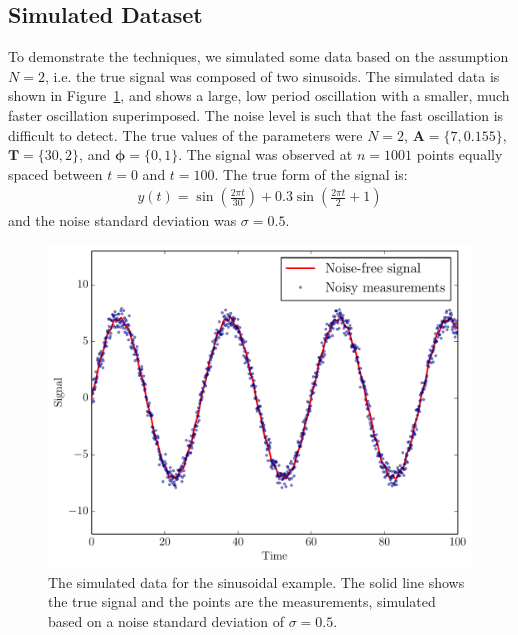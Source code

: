 \documentclass[letterpaper, 11pt]{article}
\begin{document}
\subsection{Simulated Dataset}
To demonstrate the techniques,
we simulated some data based on the assumption $N=2$, i.e. the true signal was
composed of two sinusoids.
The simulated data is shown in Figure~\ref{fig:sinewave_data}, and shows a
large, low period oscillation with a smaller, much faster oscillation
superimposed. The noise level is such that the fast oscillation is difficult
to detect. The true values of the parameters were
$N=2$, $\mathbf{A} = \{7, 0.155\}$,
$\mathbf{T}=\{30, 2\}$, and $\boldsymbol{\phi} = \{0, 1\}$. The signal was
observed at $n=1001$ points equally spaced between $t=0$ and $t=100$.
The true form of the signal is:
\begin{eqnarray}
y(t) = \sin\left(\frac{2\pi t}{30}\right) +
0.3 \sin\left(\frac{2\pi t}{2} + 1\right)
\end{eqnarray}
and the noise standard deviation was $\sigma = 0.5$.

\begin{figure}
\begin{center}
\includegraphics[scale=0.5]{sinewave_data.pdf}
\caption{The simulated data for the sinusoidal example. The solid line shows
the true signal and the points are the measurements, simulated based on a
noise standard deviation of $\sigma = 0.5$.
\label{fig:sinewave_data}}
\end{center}
\end{figure}
\end{document}
